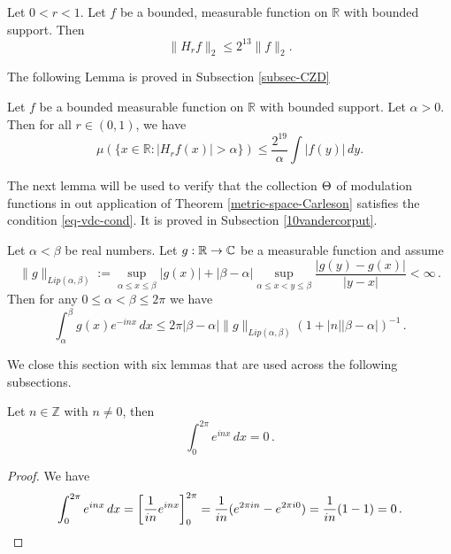 {\begin{lemma}
    \label{lem-H_r-L2-bound}
    Let $0<r<1$. Let $f$ be a bounded, measurable function on $\mathbb{R}$ with bounded support. Then
    \begin{equation}
        \label{eq-Hr-L2-bound}
        \|H_rf\|_{2}\leq 2^{13} \|f\|_2.
    \end{equation}
\end{lemma}

The following Lemma is proved in Subsection \ref{subsec-CZD}

\begin{lemma}
    \label{lem-weak-1-1}
    Let $f$ be a bounded measurable function on $\mathbb{R}$ with bounded support. Let $\alpha>0$. Then for all $r\in (0, 1)$, we have
    \begin{equation}
        \label{eq-weak-1-1}
        \mu\left(\{x\in \mathbb{R}: |H_r f(x)|>\alpha\}\right)\leq \frac{2^{19}}{\alpha} \int |f(y)|\, dy.
    \end{equation}
\end{lemma}

The next lemma will be used to verify that the collection ${\Theta}$ of modulation functions in out application of Theorem \ref{metric-space-Carleson} satisfies the condition \eqref{eq-vdc-cond}.
It is proved in Subsection \ref{10vandercorput}.

\begin{lemma}
\label{van-der-Corput}
    Let $\alpha<\beta$ be real numbers. Let $g:{\mathbb{R}}\to {\mathbb{C}}$ be a  measurable function and assume
    \begin{equation}
        \|g\|_{Lip(\alpha,\beta)}:=\sup_{\alpha\le x\le \beta}|g(x)|+|\beta-\alpha|
        \sup_{\alpha\le x<y\le \beta} \frac {|g(y)-g(x)|}{|y-x|}<\infty\, .
    \end{equation}
    Then for any $0\le \alpha<\beta\le 2\pi$ we have
    \begin{equation}
        \int _{\alpha}^{\beta} g(x) e^{-inx}\, dx\le 2\pi |\beta-\alpha|\|g\|_{Lip(\alpha,\beta)}(1+|n||\beta-\alpha|)^{-1}\, .
    \end{equation}

\end{lemma}


We close this section with six lemmas that are used
across the following subsections.

\begin{lemma}
\label{mean-zero-oscillation}
Let $n\in \mathbb{Z}$ with   $n\neq 0$, then
\begin{equation}
\int_0^{2\pi} e^{inx}\, dx=0\,.
\end{equation}
\end{lemma}
\begin{proof}
We have
\begin{equation*}
\int_0^{2\pi} e^{inx}\, dx=\left[ \frac 1{in}e^{inx}\right]_0^{2\pi}=\frac  1{in}(e^{2\pi i n}-e^{2\pi i 0})=\frac 1{in}(1-1)=0\, . \qedhere
\end{equation*}


\end{proof}}
